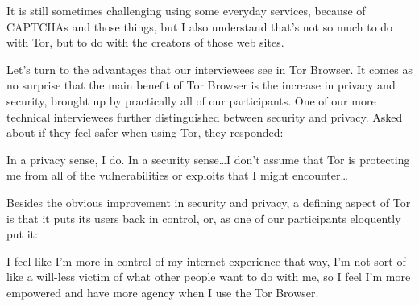 \begin{displayquote}
It is still sometimes challenging using some everyday services, because of
CAPTCHAs and those things, but I also understand that's not so much to do with
Tor, but to do with the creators of those web sites.
\end{displayquote}


Let's turn to the advantages that our interviewees see in Tor Browser.  It comes
as no surprise that the main benefit of Tor Browser is the increase in privacy
and security, brought up by practically all of our participants.  One of our
more technical interviewees further distinguished between security and privacy.
Asked about if they feel safer when using Tor, they responded:

\begin{displayquote}
In a privacy sense, I do. In a security sense\ldots I don't assume that Tor is
protecting me from all of the vulnerabilities or exploits that I might
encounter\ldots
\end{displayquote}

Besides the obvious improvement in security and privacy, a defining aspect of
Tor is that it puts its users back in control, or, as one of our participants
eloquently put it:

\begin{displayquote}
I feel like I'm more in control of my internet experience that way, I'm not sort
of like a will-less victim of what other people want to do with me, so I feel
I'm more empowered and have more agency when I use the Tor Browser.
\end{displayquote}
